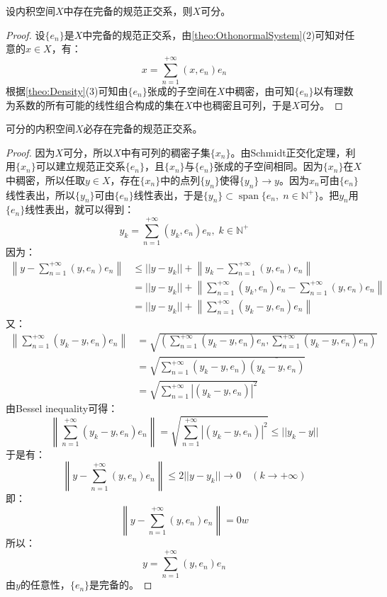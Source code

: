 \begin{corollary}
	设内积空间$X$中存在完备的规范正交系，则$X$可分。
\end{corollary}
\begin{proof}
	设$\{e_n\}$是$X$中完备的规范正交系，由\cref{theo:OthonormalSystem}(2)可知对任意的$x\in X$，有：
	\begin{equation*}
		x=\sum_{n=1}^{+\infty}(x,e_n)e_n
	\end{equation*}
	根据\cref{theo:Density}(3)可知由$\{e_n\}$张成的子空间在$X$中稠密，由可知$\{e_n\}$以有理数为系数的所有可能的线性组合构成的集在$X$中也稠密且可列，于是$X$可分。
\end{proof}
\begin{theorem}
	可分的内积空间$X$必存在完备的规范正交系。
\end{theorem}
\begin{proof}
	因为$X$可分，所以$X$中有可列的稠密子集$\{x_n\}$。由Schmidt正交化定理，利用$\{x_n\}$可以建立规范正交系$\{e_n\}$，且$\{x_n\}$与$\{e_n\}$张成的子空间相同。因为$\{x_n\}$在$X$中稠密，所以任取$y\in X$，存在$\{x_n\}$中的点列$\{y_n\}$使得$\{y_n\}\to y$。因为$x_n$可由$\{e_n\}$线性表出，所以$\{y_n\}$可由$\{e_n\}$线性表出，于是$\{y_n\}\subset\operatorname{span}\{e_n,\;n\in\mathbb{N}^+\}$。把$y_n$用$\{e_n\}$线性表出，就可以得到：
	\begin{equation*}
		y_k=\sum_{n=1}^{+\infty}(y_k,e_n)e_n,\;k\in\mathbb{N}^+
	\end{equation*}
	因为：
	\begin{align*}
		\left\|y-\sum_{n=1}^{+\infty}(y,e_n)e_n\right\|
		&\leqslant||y-y_k||+\left\|y_k-\sum_{n=1}^{+\infty}(y,e_n)e_n\right\| \\
		&=||y-y_k||+\left\|\sum_{n=1}^{+\infty}(y_k,e_n)e_n-\sum_{n=1}^{+\infty}(y,e_n)e_n\right\| \\
		&=||y-y_k||+\left\|\sum_{n=1}^{+\infty}(y_k-y,e_n)e_n\right\|
	\end{align*}
	又：
	\begin{align*}
		\left\|\sum_{n=1}^{+\infty}(y_k-y,e_n)e_n\right\|
		&=\sqrt{\left(\sum_{n=1}^{+\infty}(y_k-y,e_n)e_n,\sum_{n=1}^{+\infty}(y_k-y,e_n)e_n\right)} \\
		&=\sqrt{\sum_{n=1}^{+\infty}(y_k-y,e_n)\overline{(y_k-y,e_n)}}  
		\\
		&=\sqrt{\sum_{n=1}^{+\infty}|(y_k-y,e_n)|^2}
	\end{align*}
	由Bessel inequality可得：
	\begin{equation*}
		\left\|\sum_{n=1}^{+\infty}(y_k-y,e_n)e_n\right\|
		=\sqrt{\sum_{n=1}^{+\infty}|(y_k-y,e_n)|^2}
		\leqslant||y_k-y||
	\end{equation*}
	于是有：
	\begin{equation*}
		\left\|y-\sum_{n=1}^{+\infty}(y,e_n)e_n\right\|
		\leqslant2||y-y_k||\to0\quad(k\to+\infty)
	\end{equation*}
	即：
	\begin{equation*}
		\left\|y-\sum_{n=1}^{+\infty}(y,e_n)e_n\right\|=0w
	\end{equation*}
	所以：
	\begin{equation*}
		y=\sum_{n=1}^{+\infty}(y,e_n)e_n
	\end{equation*}
	由$y$的任意性，$\{e_n\}$是完备的。
\end{proof}
